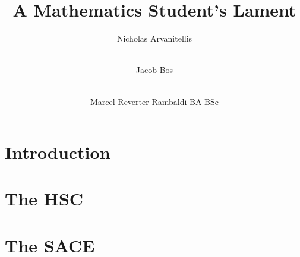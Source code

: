 \documentclass[11pt]{report}
\title{A Mathematics Student's Lament}
\author[1]{Nicholas Arvanitellis}
\author[2]{\\Jacob Bos}
\author{\\Marcel Reverter-Rambaldi BA  BSc}
\affil[1,2,3]{Australian National University}
\begin{document}
    \maketitle
    \tableofcontents
\newpage
{}

\chapter{Introduction}




\chapter{The HSC}




\chapter{The SACE}








\end{document}
